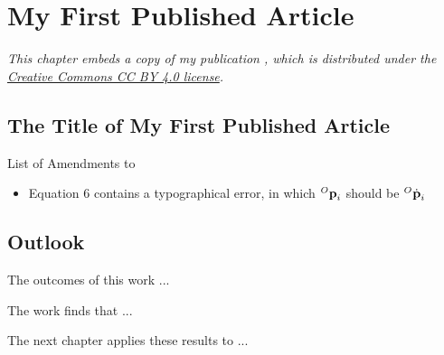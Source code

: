 \chapter{My First Published Article} \label{chap:article1}
\begin{displayquote} \emph{%
	This chapter embeds a copy of my publication \cite{example3}, which is distributed under the \href{https://creativecommons.org/licenses/by/4.0/}{Creative Commons CC BY 4.0 license}.
} \end{displayquote}




\section{The Title of My First Published Article}
List of Amendments to \cite{example3}
\begin{itemize}[topsep=0pt,beginpenalty=10000,first=]
	\item Equation 6 contains a typographical error, in which ${}^O\text{\textbf{p}}_i$ should be ${}^O\dot{\text{\textbf{p}}}_i$
\end{itemize}






\section{Outlook}
The outcomes of this work ...

The work finds that ...

The next chapter applies these results to ...

